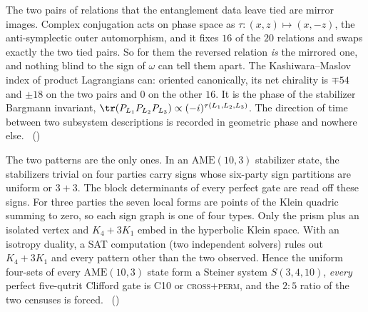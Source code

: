 
The two pairs of relations that the entanglement data leave tied are mirror images. Complex conjugation acts on phase
space as $\tau\colon(x,z)\mapsto(x,-z)$, the anti-symplectic outer automorphism, and it fixes $16$ of the $20$ relations
and swaps exactly the two tied pairs. So for them the reversed relation \emph{is} the mirrored one, and nothing blind to
the sign of $\omega$ can tell them apart. The Kashiwara--Maslov index of product Lagrangians can: oriented canonically,
its net chirality is $\mp54$ and $\pm18$ on the two pairs and $0$ on the other $16$. It is the phase of the stabilizer
Bargmann invariant, $\tr(P_{L_1}P_{L_2}P_{L_3})\propto(-i)^{\tau(L_1,L_2,L_3)}$. The direction of time between two
subsystem descriptions is recorded in geometric phase and nowhere else.
\tierC\ ()

The two patterns are the only ones. In an $\mathrm{AME}(10,3)$ stabilizer state, the stabilizers trivial on four parties
carry signs whose six-party sign partitions are uniform or $3+3$. The block determinants of every perfect gate are read
off these signs. For three parties the seven local forms are points of the Klein quadric summing to zero, so each sign
graph is one of four types. Only the prism plus an isolated vertex and $K_4+3K_1$ embed in the hyperbolic Klein space.
With an isotropy duality, a SAT computation (two independent solvers) rules out $K_4+3K_1$ and every pattern other than
the two observed. Hence the uniform four-sets of every $\mathrm{AME}(10,3)$ state form a Steiner system $S(3,4,10)$,
\emph{every} perfect five-qutrit Clifford gate is \textsc{C10} or \textsc{cross+perm}, and the $2:5$ ratio of the two
censuses is forced. \tierC\ ()

